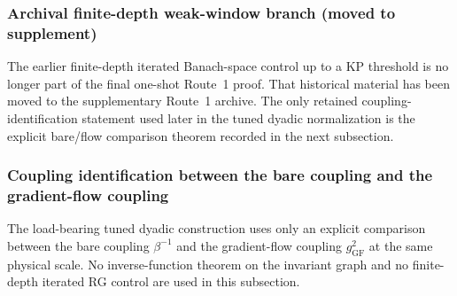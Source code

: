 \subsubsection{Archival finite-depth weak-window branch (moved to supplement)}
\label{subsec:hardened48_weak_window_iteration}

The earlier finite-depth iterated Banach-space control up to a KP threshold is no longer part of the final one-shot Route~1 proof.
That historical material has been moved to the supplementary Route~1 archive.
The only retained coupling-identification statement used later in the tuned dyadic normalization is the explicit bare/flow comparison theorem recorded in the next subsection.

\subsubsection{Coupling identification between the bare coupling and the gradient-flow coupling}
\label{subsec:hardened49_coupling_identification}

The load-bearing tuned dyadic construction uses only an explicit comparison between the bare coupling $\beta^{-1}$
and the gradient-flow coupling $g^2_{\mathrm{GF}}$ at the same physical scale.
No inverse-function theorem on the invariant graph and no finite-depth iterated RG control are used in this subsection.

